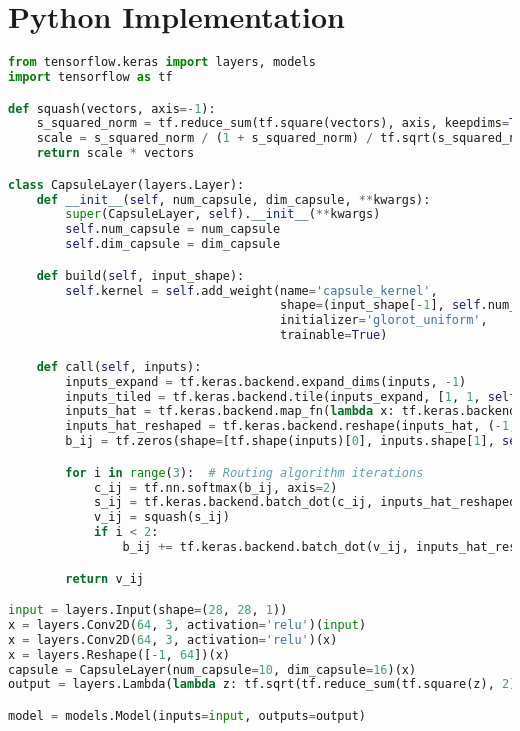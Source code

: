 \section{Python Implementation}
\begin{lstlisting}[language=Python]
from tensorflow.keras import layers, models
import tensorflow as tf

def squash(vectors, axis=-1):
    s_squared_norm = tf.reduce_sum(tf.square(vectors), axis, keepdims=True)
    scale = s_squared_norm / (1 + s_squared_norm) / tf.sqrt(s_squared_norm + tf.keras.backend.epsilon())
    return scale * vectors

class CapsuleLayer(layers.Layer):
    def __init__(self, num_capsule, dim_capsule, **kwargs):
        super(CapsuleLayer, self).__init__(**kwargs)
        self.num_capsule = num_capsule
        self.dim_capsule = dim_capsule

    def build(self, input_shape):
        self.kernel = self.add_weight(name='capsule_kernel',
                                      shape=(input_shape[-1], self.num_capsule * self.dim_capsule),
                                      initializer='glorot_uniform',
                                      trainable=True)

    def call(self, inputs):
        inputs_expand = tf.keras.backend.expand_dims(inputs, -1)
        inputs_tiled = tf.keras.backend.tile(inputs_expand, [1, 1, self.num_capsule * self.dim_capsule])
        inputs_hat = tf.keras.backend.map_fn(lambda x: tf.keras.backend.dot(x, self.kernel), elems=inputs_tiled)
        inputs_hat_reshaped = tf.keras.backend.reshape(inputs_hat, (-1, inputs.shape[1], self.num_capsule, self.dim_capsule))
        b_ij = tf.zeros(shape=[tf.shape(inputs)[0], inputs.shape[1], self.num_capsule, 1])

        for i in range(3):  # Routing algorithm iterations
            c_ij = tf.nn.softmax(b_ij, axis=2)
            s_ij = tf.keras.backend.batch_dot(c_ij, inputs_hat_reshaped, [2, 2])
            v_ij = squash(s_ij)
            if i < 2:
                b_ij += tf.keras.backend.batch_dot(v_ij, inputs_hat_reshaped, [2, 3])

        return v_ij

input = layers.Input(shape=(28, 28, 1))
x = layers.Conv2D(64, 3, activation='relu')(input)
x = layers.Conv2D(64, 3, activation='relu')(x)
x = layers.Reshape([-1, 64])(x)
capsule = CapsuleLayer(num_capsule=10, dim_capsule=16)(x)
output = layers.Lambda(lambda z: tf.sqrt(tf.reduce_sum(tf.square(z), 2)))(capsule)

model = models.Model(inputs=input, outputs=output)
\end{lstlisting}

